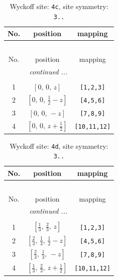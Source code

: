 \documentclass[fleqn,8pt]{jsarticle}
\begin{document}
\begin{longtable}{ccc}
\caption{Wyckoff site: {\tt 4c}, site symmetry: {\tt 3..}}
 \\
 \hline \hline
No. & position & mapping \\ \hline \endfirsthead

\multicolumn{2}{l}{\tablename\ \thetable{}} \\
 \hline \hline
No. & position & mapping \\ \hline \endhead

 \hline \hline
\multicolumn{2}{r}{\footnotesize\it continued ...} \\ \endfoot

 \hline \hline
\multicolumn{2}{r}{} \\ \endlastfoot

1 & $\left[ 0,\, 0,\, z \right]$ & {\tt [1,2,3]} \\ \hline
2 & $\left[ 0,\, 0,\, \frac{1}{2} - z \right]$ & {\tt [4,5,6]} \\ \hline
3 & $\left[ 0,\, 0,\, - z \right]$ & {\tt [7,8,9]} \\ \hline
4 & $\left[ 0,\, 0,\, z + \frac{1}{2} \right]$ & {\tt [10,11,12]} \\
\end{longtable}
\renewcommand{\arraystretch}{1.2}
\begin{longtable}{ccc}
\caption{Wyckoff site: {\tt 4d}, site symmetry: {\tt 3..}}
 \\
 \hline \hline
No. & position & mapping \\ \hline \endfirsthead

\multicolumn{2}{l}{\tablename\ \thetable{}} \\
 \hline \hline
No. & position & mapping \\ \hline \endhead

 \hline \hline
\multicolumn{2}{r}{\footnotesize\it continued ...} \\ \endfoot

 \hline \hline
\multicolumn{2}{r}{} \\ \endlastfoot

1 & $\left[ \frac{1}{3},\, \frac{2}{3},\, z \right]$ & {\tt [1,2,3]} \\ \hline
2 & $\left[ \frac{2}{3},\, \frac{1}{3},\, \frac{1}{2} - z \right]$ & {\tt [4,5,6]} \\ \hline
3 & $\left[ \frac{2}{3},\, \frac{1}{3},\, - z \right]$ & {\tt [7,8,9]} \\ \hline
4 & $\left[ \frac{1}{3},\, \frac{2}{3},\, z + \frac{1}{2} \right]$ & {\tt [10,11,12]} \\
\end{longtable}
\end{document}
